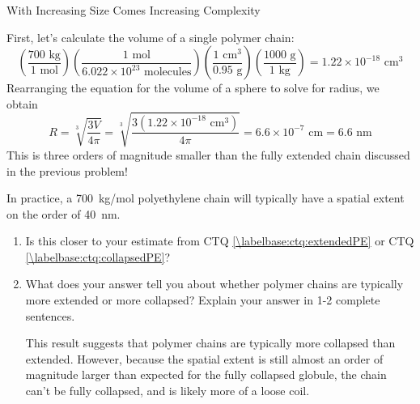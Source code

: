 \begin{activity}{With Increasing Size Comes Increasing Complexity}
\begin{ctqs}
		\begin{solution}[3.85in]
			First, let's calculate the volume of a single polymer chain:
			\begin{equation*}
				\left(\frac{700\text{ kg}}{1\text{ mol}}\right)
				\left(\frac{1\text{ mol}}{6.022\times10^{23}\text{ molecules}}\right)
				\left(\frac{1\text{ cm}^3}{0.95\text{ g}}\right)
				\left(\frac{1000\text{ g}}{1\text{ kg}}\right)
				= 1.22 \times 10^{-18}\text{ cm}^3
			\end{equation*}
			Rearranging the equation for the volume of a sphere to solve for radius, we obtain
			\begin{equation*}
				R=\sqrt[3]{\frac{3 V}{4\pi}} = \sqrt[3]{\frac{3 \left(1.22 \times 10^{-18}\text{ cm}^3\right)}{4\pi}} = 6.6 \times 10^{-7}\text{ cm} = 6.6\text{ nm}
			\end{equation*}
			This is three orders of magnitude smaller than the fully extended chain discussed in the previous problem!
		\end{solution}
		
	\question In practice, a 700~kg/mol polyethylene chain will typically have a spatial extent on the order of 40~nm.  
	
		\begin{enumerate}
			\item Is this closer to your estimate from CTQ \ref{\labelbase:ctq:extendedPE} or CTQ \ref{\labelbase:ctq:collapsedPE}?
			
				\begin{solution}[0.5in]\end{solution}
			
			\item What does your answer tell you about whether polymer chains are typically more extended or more collapsed?  Explain your answer in 1-2 complete sentences.
			
				\begin{solution}[1.75in]
					This result suggests that polymer chains are typically more collapsed than extended.  However, because the spatial extent is still almost an order of magnitude larger than expected for the fully collapsed globule, the chain can't be fully collapsed, and is likely more of a loose coil.
				\end{solution}
			
		\end{enumerate}
		

\end{ctqs}
\end{activity}
